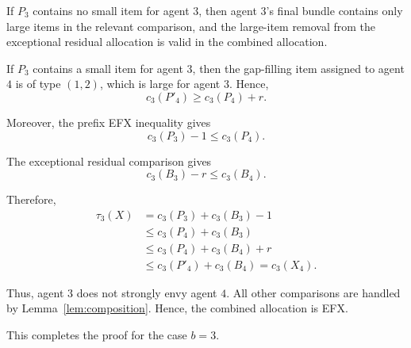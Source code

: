 \documentclass{article}
\theoremstyle{definition}
\begin{document}
If $P_3$ contains no small item for agent $3$, then agent $3$'s final bundle
contains only large items in the relevant comparison, and the large-item
removal from the exceptional residual allocation is valid in the combined
allocation.

If $P_3$ contains a small item for agent $3$, then the gap-filling item
assigned to agent $4$ is of type $(1,2)$, which is large for agent $3$.
Hence,
\[
    c_3(P'_4)\ge c_3(P_4)+r.
\]

Moreover, the prefix EFX inequality gives
\[
    c_3(P_3)-1\le c_3(P_4).
\]

The exceptional residual comparison gives
\[
    c_3(B_3)-r\le c_3(B_4).
\]

Therefore,
\[
\begin{aligned}
    \tau_3(X)
    &=c_3(P_3)+c_3(B_3)-1 \\
    &\le c_3(P_4)+c_3(B_3) \\
    &\le c_3(P_4)+c_3(B_4)+r \\
    &\le c_3(P'_4)+c_3(B_4)
    =c_3(X_4).
\end{aligned}
\]

Thus, agent $3$ does not strongly envy agent $4$.  All other comparisons are
handled by Lemma~\ref{lem:composition}.  Hence, the combined allocation is EFX.

This completes the proof for the case $b=3$.
\end{document}
